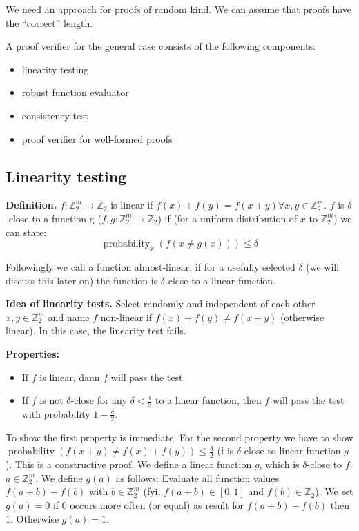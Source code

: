 \documentclass[a4paper]{article}
\DeclareMathOperator{\prop}{probability}
\begin{document}
We need an approach for proofs of random kind. We can assume that proofs have the ``correct'' length.

A proof verifier for the general case consists of the following components:
\begin{itemize}
  \item linearity testing
  \item robust function evaluator
  \item consistency test
  \item proof verifier for well-formed proofs
\end{itemize}

\subsection{Linearity testing}
%
\textbf{Definition.} $f: \mathbb{Z}_2^m \rightarrow \mathbb{Z}_2$
  is linear if $f(x) + f(y) = f(x + y) \forall x, y \in \mathbb{Z}_2^m$.
  $f$ is $\delta$-close to a function g
  ($f, g: \mathbb{Z}_2^m \rightarrow \mathbb{Z}_2$)
  if (for a uniform distribution of $x$ to $\mathbb{Z}_2^m$) we can state:
  \[
    \prop_x (f(x \neq g(x))) \leq \delta
  \]

Followingly we call a function almost-linear, if for a usefully selected
$\delta$ (we will discuss this later on) the function is $\delta$-close
to a linear function.

\textbf{Idea of linearity tests.}
  Select randomly and independent of each other $x, y \in \mathbb{Z}_2^m$
  and name $f$ non-linear if $f(x) + f(y) \neq f(x + y)$ (otherwise
  linear). In this case, the linearity test fails.

\textbf{Properties:}
\begin{itemize}
  \item
    If $f$ is linear, dann $f$ will pass the test.
  \item
    If $f$ is not $\delta$-close for any $\delta < \frac13$ to a linear function,
    then $f$ will pass the test with probability $1 - \frac{\delta}{2}$.
\end{itemize}

To show the first property is immediate.
For the second property we have to show $\prop(f(x + y)
\neq f(x) + f(y)) \leq \frac{\delta}{2}$ (f is $\delta$-close to
linear function $g$). This is a constructive proof. We define a linear function
$g$, which is $\delta$-close to $f$. $a \in \mathbb{Z}_2^m$. We define
$g(a)$ as follows: Evaluate all function values $f(a + b) - f(b)$ with
$b \in \mathbb{Z}_2^m$ (fyi, $f(a+b) \in [0,1]$ and $f(b) \in \mathbb{Z}_2$).
We set $g(a) = 0$ if $0$ occurs more often (or equal) as result for
$f(a+b) - f(b)$ then $1$. Otherwise $g(a) = 1$.
\end{document}
